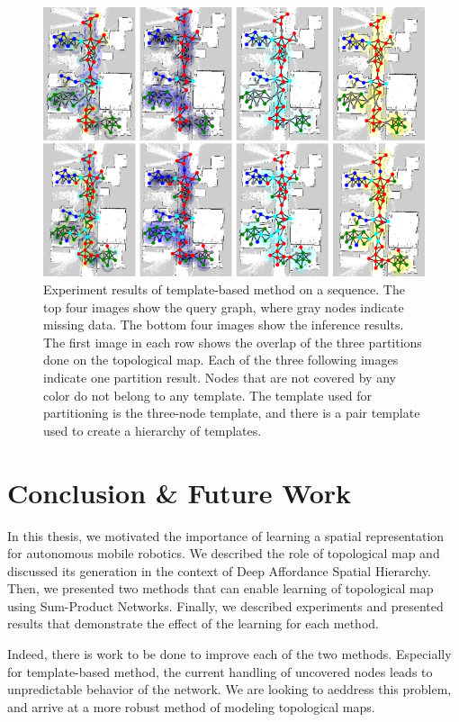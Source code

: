 \documentclass[10pt, titlepage]{article}
\theoremstyle{definition}
\begin{document}
\begin{figure}[!htb]
    \centering
    \captionsetup{width=.8\linewidth}
    \includegraphics[scale=0.8]{images/topo_result.png}
    \caption{Experiment results of template-based method on a sequence. The top four images show the query graph, where gray nodes indicate missing data. The bottom four images show the inference results. The first image in each row shows the overlap of the three partitions done on the topological map. Each of the three following images indicate one partition result. Nodes that are not covered by any color do not belong to any template. The template used for partitioning is the three-node template, and there is a pair template used to create a hierarchy of templates.}
    \label{fig:tmpl_result}
\end{figure}
\section{Conclusion \& Future Work}\label{section:conclusion}

In this thesis, we motivated the importance of learning a spatial representation for autonomous mobile robotics. We described the role of topological map and discussed its generation in the context of Deep Affordance Spatial Hierarchy. Then, we presented two methods that can enable learning of topological map using Sum-Product Networks. Finally, we described experiments and presented results that demonstrate the effect of the learning for each method.

Indeed, there is work to be done to improve each of the two methods. Especially for template-based method, the current handling of uncovered nodes leads to unpredictable behavior of the network. We are looking to aeddress this problem, and arrive at a more robust method of modeling topological maps.
\end{document}
